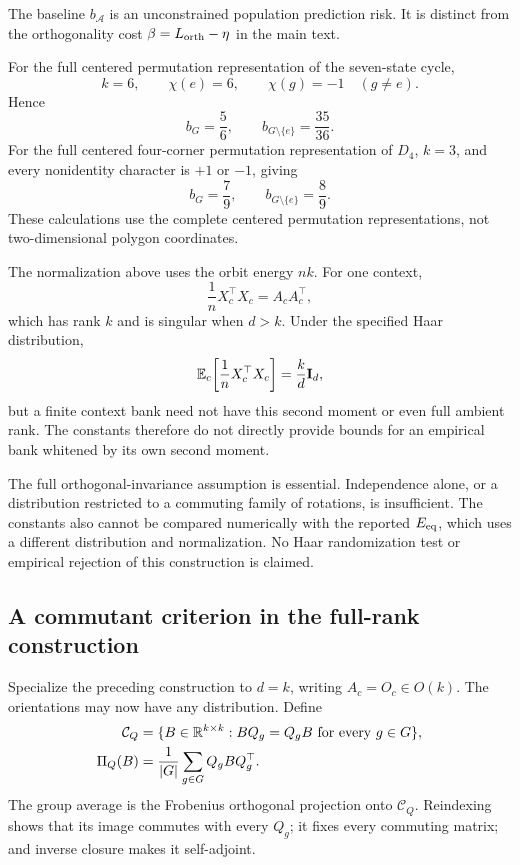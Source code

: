 The baseline $b_{\mathcal A}$ is an unconstrained
population prediction risk.
It is distinct from the orthogonality cost
$\beta=L_{\rm orth}-\eta$ in the main text.

For the full centered permutation representation of the
seven-state cycle,
\[
 k=6,\qquad
 \chi(e)=6,\qquad
 \chi(g)=-1\quad(g\ne e).
\]
Hence
\[
 b_G=\frac56,
 \qquad
 b_{G\setminus\{e\}}=\frac{35}{36}.
\]
For the full centered four-corner permutation
representation of $D_4$, $k=3$, and every nonidentity
character is $+1$ or $-1$, giving
\[
 b_G=\frac79,
 \qquad
 b_{G\setminus\{e\}}=\frac89.
\]
These calculations use the complete centered permutation
representations, not two-dimensional polygon coordinates.

The normalization above uses the orbit energy $nk$.
For one context,
\[
 \frac1nX_c^\top X_c=A_cA_c^\top,
\]
which has rank $k$ and is singular when $d>k$.
Under the specified Haar distribution,
\[
 \mathbb E_c\!\left[\frac1nX_c^\top X_c\right]
 =\frac{k}{d}\mathbf{I}_d,
\]
but a finite context bank need not have this second
moment or even full ambient rank.
The constants therefore do not directly provide bounds
for an empirical bank whitened by its own second moment.

The full orthogonal-invariance assumption is essential.
Independence alone, or a distribution restricted to a
commuting family of rotations, is insufficient.
The constants also cannot be compared numerically with
the reported $E_{\mathrm{eq}}$, which uses a different distribution
and normalization.
No Haar randomization test or empirical rejection of
this construction is claimed.


\subsection{A commutant criterion in the full-rank construction}
\label{app:commutant}

Specialize the preceding construction to $d=k$, writing
$A_c=O_c\in O(k)$.
The orientations may now have any distribution.
Define
\begin{align*}
 \mathcal C_Q
 &=\{B\in\mathbb{R}^{k\times k}:BQ_g=Q_gB
                         \text{ for every }g\in G\},\\
 \Pi_Q(B)
 &=\frac1{|G|}\sum_{g\in G}Q_gBQ_g^\top.
\end{align*}
The group average is the Frobenius orthogonal projection
onto $\mathcal C_Q$.
Reindexing shows that its image commutes with every
$Q_g$; it fixes every commuting matrix; and inverse
closure makes it self-adjoint.

